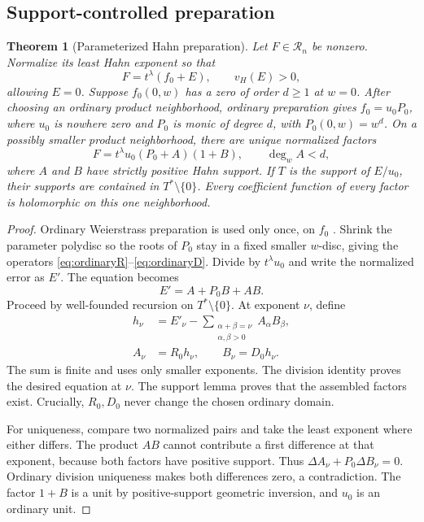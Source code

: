 \documentclass[11pt]{article}
\newtheorem{theorem}{Theorem}[section]
\theoremstyle{definition}
\newcommand{\RR}{\mathscr R}
\begin{document}
\subsection{Support-controlled preparation}
\begin{theorem}[Parameterized Hahn preparation]\label{thm:prep}
Let $F\in\RR_n$ be nonzero. Normalize its least Hahn exponent so that
\[
 F=t^\lambda(f_0+E),\qquad v_H(E)>0,
\]
allowing $E=0$. Suppose $f_0(0,w)$ has a zero of order $d\ge1$ at $w=0$. After choosing an ordinary product neighborhood, ordinary preparation gives $f_0=u_0P_0$, where $u_0$ is nowhere zero and $P_0$ is monic of degree $d$, with $P_0(0,w)=w^d$. On a possibly smaller product neighborhood, there are unique normalized factors
\begin{equation}\label{eq:prep}
 F=t^\lambda u_0(P_0+A)(1+B),\qquad \deg_w A<d,
\end{equation}
where $A$ and $B$ have strictly positive Hahn support. If $T$ is the support of $E/u_0$, their supports are contained in $T^*\setminus\{0\}$. Every coefficient function of every factor is holomorphic on this one neighborhood.
\end{theorem}
\begin{proof}
Ordinary Weierstrass preparation is used only once, on $f_0$ \cite{GR}. Shrink the parameter polydisc so the roots of $P_0$ stay in a fixed smaller $w$-disc, giving the operators \eqref{eq:ordinaryR}--\eqref{eq:ordinaryD}. Divide by $t^\lambda u_0$ and write the normalized error as $E'$. The equation becomes
\[
 E'=A+P_0B+AB.
\]
Proceed by well-founded recursion on $T^*\setminus\{0\}$. At exponent $\nu$, define
\begin{align}
 h_\nu&=E'_\nu-
   \sum_{\substack{\alpha+\beta=\nu\\\alpha,\beta>0}}
        A_\alpha B_\beta,\label{eq:preprecursion1}\\
 A_\nu&=R_0h_\nu,\qquad B_\nu=D_0h_\nu.\label{eq:preprecursion2}
\end{align}
The sum is finite and uses only smaller exponents. The division identity proves the desired equation at $\nu$. The support lemma proves that the assembled factors exist. Crucially, $R_0,D_0$ never change the chosen ordinary domain.

For uniqueness, compare two normalized pairs and take the least exponent where either differs. The product $AB$ cannot contribute a first difference at that exponent, because both factors have positive support. Thus $\Delta A_\nu+P_0\Delta B_\nu=0$. Ordinary division uniqueness makes both differences zero, a contradiction. The factor $1+B$ is a unit by positive-support geometric inversion, and $u_0$ is an ordinary unit.
\end{proof}
\end{document}
